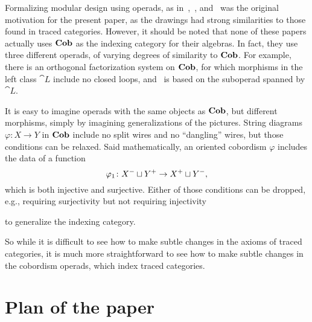 \documentclass[12pt,oneside,article,draft]{memoir}
\begin{document}
Formalizing modular design using operads, as in~\cite{Spivak},~\cite{RupelSpivak}, and~\cite{VagnerSpivakLerman} was the original
motivation for the present paper, as the drawings had strong similarities to those found in traced
categories.  However, it should be noted that none of these papers actually uses $\mathbf{Cob}$ as the
indexing category for their algebras.  In fact, they use three different operads, of varying degrees
of similarity to $\mathbf{Cob}$.  For example, there is an orthogonal factorization system on $\mathbf{Cob}$, for
which morphisms in the left class $\cat{L}$ include no closed loops, and~\cite{VagnerSpivakLerman}
is based on the suboperad spanned by $\cat{L}$.

It is easy to imagine operads with the same objects as $\mathbf{Cob}$, but different morphisms, simply by
imagining generalizations of the pictures.  String diagrams $\varphi\colon X\to Y$ in $\mathbf{Cob}$ include
no split wires and no ``dangling'' wires, but those conditions can be relaxed.  Said mathematically,
an oriented cobordism $\varphi$ includes the data of a function
$$\varphi_1\colon X^-\sqcup Y^+\to X^+\sqcup Y^-,$$ which is both injective and
surjective.  Either of those conditions can be dropped, e.g., requiring surjectivity but not
requiring injectivity
\begin{center}
\end{center}
to generalize the indexing category.

So while it is difficult to see how to make subtle changes in the axioms of traced categories, it is
much more straightforward to see how to make subtle changes in the cobordism operads, which index
traced categories.


\section{Plan of the paper}
\end{document}
